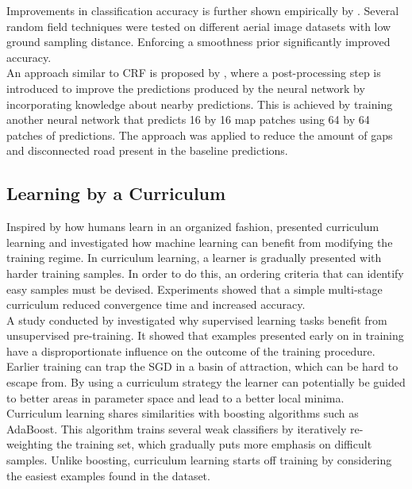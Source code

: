 Improvements in classification accuracy is further shown empirically by \cite{Schindler_random_field_overview}. Several random field techniques were tested on different aerial image datasets with low ground sampling distance. Enforcing a smoothness prior significantly improved accuracy. \\

An approach similar to \ac{CRF} is proposed by \cite{Mnih_roads_high_res_aerial_images}, where a post-processing step is introduced to improve the predictions produced by the neural network by incorporating knowledge about nearby predictions. This is achieved by training another neural network that predicts 16 by 16 map patches using 64 by 64 patches of predictions. The approach was applied to reduce the amount of gaps and disconnected road present in the baseline predictions. 


 
\subsection{Learning by a Curriculum}
Inspired by how humans learn in an organized fashion, \cite{Bengio_curriculumlearning} presented curriculum learning and investigated how machine learning can benefit from modifying the training regime. In curriculum learning, a learner is gradually presented with harder training samples. In order to do this, an ordering criteria that can identify easy samples must be devised. Experiments showed that a simple multi-stage curriculum reduced convergence time and increased accuracy. \\

A study conducted by \cite{Erhan-unsupervised-pre-training} investigated why supervised learning tasks benefit from unsupervised pre-training. It showed that examples presented early on in training have a disproportionate influence on the outcome of the training procedure. Earlier training can trap the \ac{SGD} in a basin of attraction, which can be hard to escape from.  By using a curriculum strategy the learner can potentially be guided to better areas in parameter space and lead to a better local minima. \\

Curriculum learning shares similarities with boosting algorithms such as AdaBoost. This algorithm trains several weak classifiers by iteratively re-weighting the training set, which gradually puts more emphasis on difficult samples. Unlike boosting, curriculum learning starts off training by considering the easiest examples found in the dataset.\\


